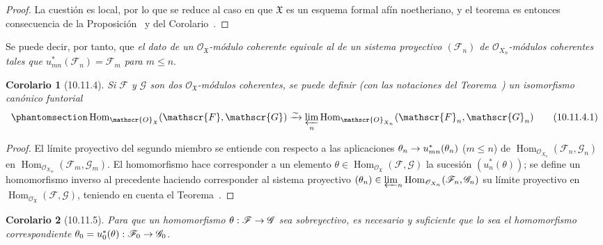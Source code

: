 \documentclass[oneside]{amsart}
\theoremstyle{ega-env-style}
\theoremstyle{ega-thm-env-style}
\newtheorem*{corollary}{Corolario}
\theoremstyle{ega-defn-env-style}
\def\leq{\leqslant}                 %
\renewcommand{\to}{\mathchoice{\longrightarrow}{\rightarrow}{\rightarrow}{\rightarrow}}
\let\EGAOriginalLabel\label
\renewcommand{\label}[1]{\phantomsection\EGAOriginalLabel{#1}}
\begin{document}
\begin{proof}
La cuestión es local, por lo que se reduce al caso en que $\mathfrak{X}$ es un esquema formal afín noetheriano, y el teorema es entonces consecuencia de la Proposición~ y del Corolario~.
\end{proof}

Se puede decir, por tanto, que \emph{el dato de un $\mathscr{O}_{\mathfrak{X}}$-módulo coherente equivale al de un sistema proyectivo $(\mathscr{F}_n)$ de $\mathscr{O}_{X_n}$-módulos coherentes tales que $u_{mn}^*(\mathscr{F}_n)=\mathscr{F}_m$ para $m\leq n$}.

\begin{corollary}[10.11.4]
\label{I.10.11.4}
Si $\mathscr{F}$ y $\mathscr{G}$ son dos $\mathscr{O}_{\mathfrak{X}}$-módulos coherentes, se puede definir \textup{(con las notaciones del Teorema~)} un isomorfismo canónico funtorial
\[
  \label{I.10.11.4.1-fr}
  \operatorname{Hom}_{\mathscr{O}_{\mathfrak{X}}}
  (\mathscr{F},\mathscr{G})
  \xrightarrow{\sim}
  \varprojlim_n
  \operatorname{Hom}_{\mathscr{O}_{X_n}}
  (\mathscr{F}_n,\mathscr{G}_n)
  \tag{10.11.4.1}
\]
\end{corollary}

\begin{proof}
El límite proyectivo del segundo miembro se entiende con respecto a las aplicaciones $\theta_n\to u_{mn}^*(\theta_n)$ ($m\leq n$) de $\operatorname{Hom}_{\mathscr{O}_{X_n}}
(\mathscr{F}_n,\mathscr{G}_n)$ en $\operatorname{Hom}_{\mathscr{O}_{X_m}}
(\mathscr{F}_m,\mathscr{G}_m)$.
El homomorfismo  hace corresponder a un elemento $\theta\in\operatorname{Hom}_{\mathscr{O}_{\mathfrak{X}}}
(\mathscr{F},\mathscr{G})$ la sucesión $(u_n^*(\theta))$; se define un homomorfismo inverso al precedente haciendo corresponder al sistema proyectivo $(\theta_n)\in\varprojlim_n
\operatorname{Hom}_{\mathscr{O}_{X_n}}
(\mathscr{F}_n,\mathscr{G}_n)$ su límite proyectivo en $\operatorname{Hom}_{\mathscr{O}_{\mathfrak{X}}}
(\mathscr{F},\mathscr{G})$, teniendo en cuenta el Teorema~.
\end{proof}

\begin{corollary}[10.11.5]
\label{I.10.11.5}
Para que un homomorfismo $\theta:\mathscr{F}\to\mathscr{G}$ sea sobreyectivo, es necesario y suficiente que lo sea el homomorfismo correspondiente $\theta_0=u_0^*(\theta):\mathscr{F}_0\to\mathscr{G}_0$.
\end{corollary}
\end{document}
